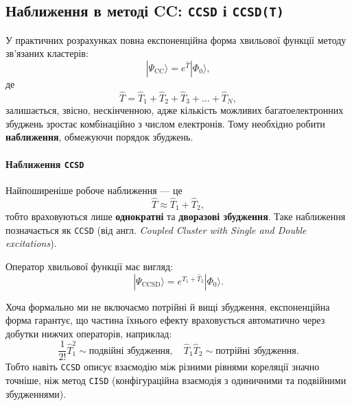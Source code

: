 %

\subsection{Наближення в методі CC: \texttt{CCSD} і \texttt{CCSD(T)}}

У практичних розрахунках повна експоненційна форма хвильової функції методу
зв'язаних кластерів:
\[
|\Psi_{\text{CC}}\rangle = e^{\hat{T}} |\Phi_0\rangle,
\]
де
\[
\hat{T} = \hat{T}_1 + \hat{T}_2 + \hat{T}_3 + \dots + \hat{T}_N,
\]
залишається, звісно, нескінченною, адже кількість можливих багатоелектронних
збуджень зростає комбінаційно з числом електронів.
Тому необхідно робити \textbf{наближення}, обмежуючи порядок збуджень.

\paragraph{Наближення \texttt{CCSD}}
Найпоширеніше робоче наближення --- це
\[
\hat{T} \approx \hat{T}_1 + \hat{T}_2,
\]
тобто враховуються лише \textbf{однократні} та \textbf{дворазові збудження}.
Таке наближення позначається як \texttt{CCSD}
(від англ. \emph{Coupled Cluster with Single and Double excitations}).

Оператор хвильової функції має вигляд:
\[
|\Psi_{\text{CCSD}}\rangle = e^{\hat{T}_1 + \hat{T}_2} |\Phi_0\rangle.
\]

Хоча формально ми не включаємо потрійні й вищі збудження,
експоненційна форма гарантує, що частина їхнього ефекту враховується автоматично
через добутки нижчих операторів, наприклад:
\[
\frac{1}{2!}\hat{T}_1^2 \sim \text{подвійні збудження}, \quad
\hat{T}_1 \hat{T}_2 \sim \text{потрійні збудження}.
\]
Тобто навіть \texttt{CCSD} описує взаємодію між різними рівнями кореляції значно точніше,
ніж метод \texttt{CISD} (конфігураційна взаємодія з одиничними та подвійними збудженнями).

